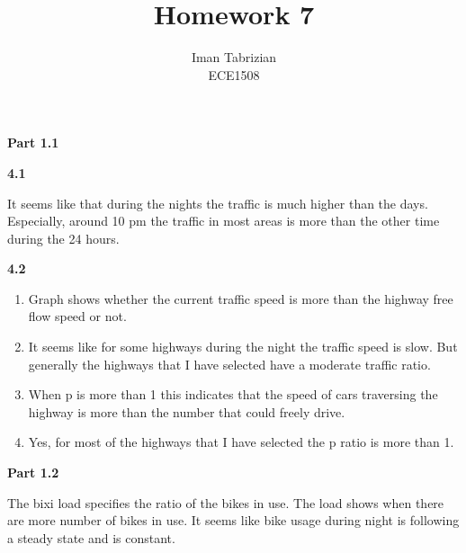 \documentclass[12pt]{article}
\begin{document}
 
 
\title{Homework 7}
\author{Iman Tabrizian\\ %
ECE1508}

\maketitle

\vspace{5mm} 
\textbf{Part 1.1}

\vspace{2mm} 

\vspace{5mm} 

\textbf{4.1}

\vspace{2mm} 

It seems like that during the nights the traffic is much higher than the days. 
Especially, around 10 pm the traffic in most areas is more than the other time during the 24 hours. \\


\vspace{5mm} 

\textbf{4.2}

\vspace{2mm} 

\begin{enumerate}
	\item Graph shows whether the current traffic speed is more than the highway free flow speed or not.
	\item It seems like for some highways during the night the traffic speed is slow. But generally the highways that I have selected have a moderate traffic ratio.
	\item When p is more than 1 this indicates that the speed of cars traversing the highway is more than the number that could freely drive. 
	\item Yes, for most of the highways that I have selected the p ratio is more than 1.

\end{enumerate}

\vspace{5mm} 
\textbf{Part 1.2}

\vspace{2mm} 


The bixi load specifies the ratio of the bikes in use. The load shows when
there are more number of bikes in use. It seems like bike usage during night
is following a steady state and is constant. \\
\end{document}

